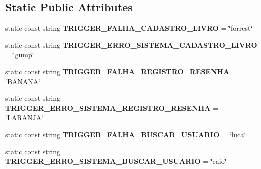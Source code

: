 \subsection*{Static Public Attributes}
\begin{DoxyCompactItemize}
\item 
\mbox{\label{classSTUBComandosusuarioautenticado_a6130917026c71c1c20d2aee41ab916a8}} 
static const string {\bfseries T\+R\+I\+G\+G\+E\+R\+\_\+\+F\+A\+L\+H\+A\+\_\+\+C\+A\+D\+A\+S\+T\+R\+O\+\_\+\+L\+I\+V\+RO} = \char`\"{}forrest\char`\"{}
\item 
\mbox{\label{classSTUBComandosusuarioautenticado_a07ca908a055324beeb90eab1f3926933}} 
static const string {\bfseries T\+R\+I\+G\+G\+E\+R\+\_\+\+E\+R\+R\+O\+\_\+\+S\+I\+S\+T\+E\+M\+A\+\_\+\+C\+A\+D\+A\+S\+T\+R\+O\+\_\+\+L\+I\+V\+RO} = \char`\"{}gump\char`\"{}
\item 
\mbox{\label{classSTUBComandosusuarioautenticado_a5b1058157df116b390a06c1f802b8c3b}} 
static const string {\bfseries T\+R\+I\+G\+G\+E\+R\+\_\+\+F\+A\+L\+H\+A\+\_\+\+R\+E\+G\+I\+S\+T\+R\+O\+\_\+\+R\+E\+S\+E\+N\+HA} = \char`\"{}B\+A\+N\+A\+NA\char`\"{}
\item 
\mbox{\label{classSTUBComandosusuarioautenticado_a9f46bca32f1eb4d9efdf336f63c40397}} 
static const string {\bfseries T\+R\+I\+G\+G\+E\+R\+\_\+\+E\+R\+R\+O\+\_\+\+S\+I\+S\+T\+E\+M\+A\+\_\+\+R\+E\+G\+I\+S\+T\+R\+O\+\_\+\+R\+E\+S\+E\+N\+HA} = \char`\"{}L\+A\+R\+A\+N\+JA\char`\"{}
\item 
\mbox{\label{classSTUBComandosusuarioautenticado_aaf54abf3405c0feca3ebc1130ed2d9ae}} 
static const string {\bfseries T\+R\+I\+G\+G\+E\+R\+\_\+\+F\+A\+L\+H\+A\+\_\+\+B\+U\+S\+C\+A\+R\+\_\+\+U\+S\+U\+A\+R\+IO} = \char`\"{}luca\char`\"{}
\item 
\mbox{\label{classSTUBComandosusuarioautenticado_ab9d312722af5596334113f2afea9646d}} 
static const string {\bfseries T\+R\+I\+G\+G\+E\+R\+\_\+\+E\+R\+R\+O\+\_\+\+S\+I\+S\+T\+E\+M\+A\+\_\+\+B\+U\+S\+C\+A\+R\+\_\+\+U\+S\+U\+A\+R\+IO} = \char`\"{}caio\char`\"{}
\item 

\end{DoxyCompactItemize}
